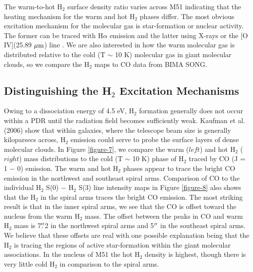 \documentclass[manuscript]{aastex}
\begin{document}
The warm-to-hot H$_2$ surface density ratio varies across 
M51 indicating that the heating mechanism for the warm 
and hot H$_2$ phases differ.  The most obvious excitation 
mechanism for the molecular gas is star-formation or nuclear 
activity.  The former can be traced with H$\alpha$ emission 
\citep{sco01} and the latter using X-rays or the [O IV](25.89 $\mbox{$\mu$m}$) 
line \citep{ss99, smi04}.  We are also interested in how the 
warm molecular gas is distributed relative to the cold 
(T $\sim$ 10 K) molecular gas in giant molecular clouds, 
so we compare the H$_2$ maps to CO data from BIMA SONG. 

\subsection{Distinguishing the H$_2$ Excitation Mechanisms}

Owing to a dissociation energy of 4.5
eV, $\mathrm{H_2}$ formation generally does not occur within a PDR
until the radiation field becomes sufficiently weak.  Kaufman et al. (2006)
show that within galaxies, where the
telescope beam size is generally kiloparsecs across, $\mathrm{H_2}$
emission could serve to probe the surface layers of dense molecular
clouds.  In Figure \ref{figure-7}, we compare the warm ($left$) and hot
$\mathrm{H_2}$ ($right$) mass distributions to the cold (T $\sim$ 10 K) 
phase of H$_2$ traced by CO (J = 1 $-$ 0) emission.  The warm and hot 
H$_2$ phases appear to trace the bright CO emission
in the northwest and southeast spiral arms. Comparison 
of CO to the individual H$_2$  S(0) $-$ H$_2$ S(3) line intensity 
maps in Figure \ref{figure-8} also shows that the H$_2$ in the spiral arms traces the 
bright CO emission.  The most striking result is that in the inner spiral arms, we see that the
CO is offset toward the nucleus from the warm $\mathrm{H_2}$ mass.
The offset between the peaks in CO and warm $\mathrm{H_2}$ mass is
7$\mbox{$.\!\!^{\prime\prime}$}$2 in the northwest spiral arms and 5$\mbox{$^{\prime\prime}$}$ in the
southeast spiral arms.  We believe that these offsets are real with
one possible explanation being that the $\mathrm{H_2}$ is tracing the
regions of active star-formation within the giant molecular
associations.  In the nucleus of M51 the hot H$_2$ density 
is highest, though there is very little cold H$_2$ in 
comparison to the spiral arms.
\end{document}
